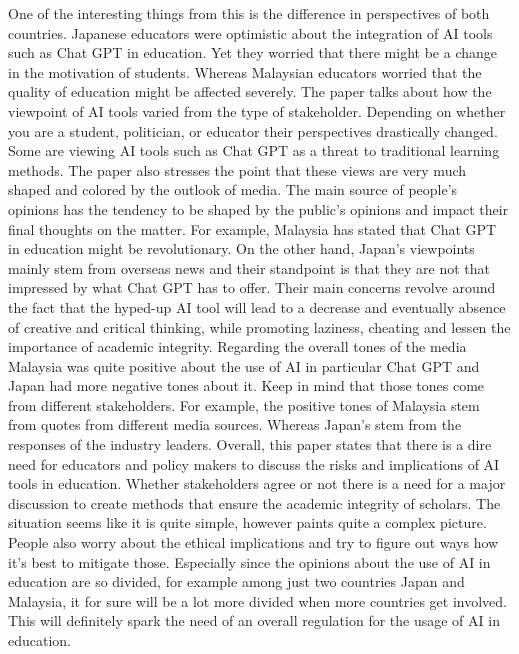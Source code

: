 \documentclass{imc-inf}
\begin{document}
One of the interesting things from this \cite{3} is the difference in perspectives of both countries. Japanese educators were optimistic about the integration of AI tools such as Chat GPT in education. Yet they worried that there might be a change in the motivation of students. Whereas Malaysian educators worried that the quality of education might be affected severely. The paper talks about how the viewpoint of AI tools varied from the type of stakeholder. Depending on whether you are a student, politician, or educator their perspectives drastically changed. Some are viewing AI tools such as Chat GPT as a threat to traditional learning methods. The paper also stresses the point that these views are very much shaped and colored by the outlook of media. The main source of people’s opinions has the tendency to be shaped by the public’s opinions and impact their final thoughts on the matter. For example, Malaysia has stated that Chat GPT in education might be revolutionary. On the other hand, Japan’s viewpoints mainly stem from overseas news and their standpoint is that they are not that impressed by what Chat GPT has to offer. Their main concerns revolve around the fact that the hyped-up AI tool will lead to a decrease and eventually absence of creative and critical thinking, while promoting laziness, cheating and lessen the importance of academic integrity. Regarding the overall tones of the media Malaysia was quite positive about the use of AI in particular Chat GPT and Japan had more negative tones about it. Keep in mind that those tones come from different stakeholders. For example, the positive tones of Malaysia stem from quotes from different media sources. Whereas Japan’s stem from the responses of the industry leaders. 
Overall, this paper states that there is a dire need for educators and policy makers to discuss the risks and implications of AI tools in education. Whether stakeholders agree or not there is a need for a major discussion to create methods that ensure the academic integrity of scholars. The situation seems like it is quite simple, however paints quite a complex picture. People also worry about the ethical implications and try to figure out ways how it’s best to mitigate those. Especially since the opinions about the use of AI in education are so divided, for example among just two countries Japan and Malaysia, it for sure will be a lot more divided when more countries get involved. This will definitely spark the need of an overall regulation for the usage of AI in education. 
\end{document}
